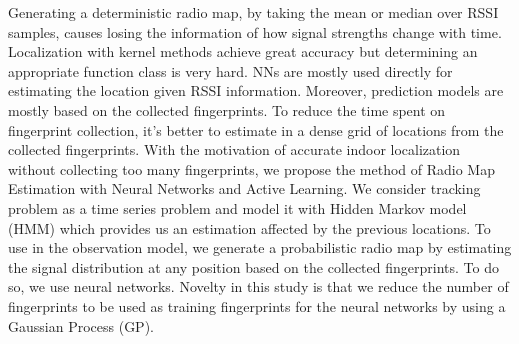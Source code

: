 \documentclass{article}
\begin{document}
	Generating a deterministic radio map, by taking the mean or median over RSSI samples, causes losing the information of how signal strengths change with time. Localization with kernel methods achieve great accuracy \cite{Roo2002} but determining an appropriate function class is very hard. NNs are mostly used directly for estimating the location given RSSI information. Moreover, prediction models are mostly based on the collected fingerprints. To reduce the time spent on fingerprint collection, it's better to estimate in a dense grid of locations from the collected fingerprints. With the motivation of accurate indoor localization without collecting too many fingerprints, we propose the method of Radio Map Estimation with Neural Networks and Active Learning. We consider tracking problem as a time series problem and model it with Hidden Markov model (HMM) which provides us an estimation affected by the previous locations. To use in the observation model, we generate a probabilistic radio map by estimating the signal distribution at any position based on the collected fingerprints. To do so, we use neural networks. Novelty in this study is that we reduce the number of fingerprints to be used as training fingerprints for the neural networks by using a Gaussian Process (GP). %
	
\end{document}
